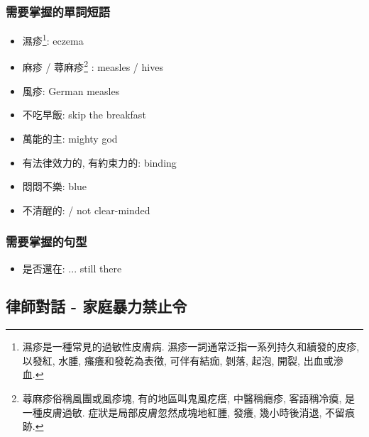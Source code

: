 \subsubsection*{需要掌握的單詞短語}
\begin{multicols}{2}
\begin{itemize}
  \itemsep0em
  \item 濕疹\footnote{濕疹是一種常見的過敏性皮膚病. 濕疹一詞通常泛指一系列持久和續發的皮疹, 以發紅, 水腫, 瘙癢和發乾為表徵, 可伴有結痂, 剝落, 起泡, 開裂, 出血或滲血.}: eczema
  \item 麻疹 / 蕁麻疹\footnote{蕁麻疹俗稱風團或風疹塊, 有的地區叫鬼風疙瘩, 中醫稱癮疹, 客語稱冷瘼, 是一種皮膚過敏. 症狀是局部皮膚忽然成塊地紅腫, 發癢, 幾小時後消退, 不留痕跡.} : measles / hives
  \item 風疹: German measles
  \item 不吃早飯: skip the breakfast
  \item 萬能的主: mighty god
  \item 有法律效力的, 有約束力的: binding
  \item 悶悶不樂: blue
  \item 不清醒的:  / not clear-minded
\end{itemize}
\end{multicols}

\subsubsection*{需要掌握的句型}
\begin{multicols}{2}
\begin{itemize}
  \itemsep0em
  \item 是否還在: ... still there
\end{itemize}
\end{multicols}

\subsection{律師對話 - 家庭暴力禁止令}
